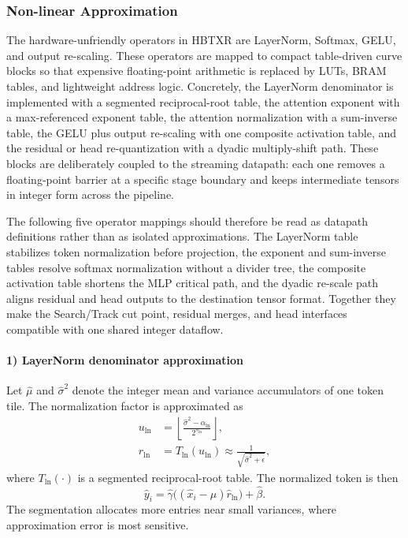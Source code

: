 \documentclass[journal]{IEEEtran}
\begin{document}
\subsubsection{Non-linear Approximation}
The hardware-unfriendly operators in HBTXR are LayerNorm, Softmax, GELU, and output re-scaling. These operators are mapped to compact table-driven curve blocks so that expensive floating-point arithmetic is replaced by LUTs, BRAM tables, and lightweight address logic. Concretely, the LayerNorm denominator is implemented with a segmented reciprocal-root table, the attention exponent with a max-referenced exponent table, the attention normalization with a sum-inverse table, the GELU plus output re-scaling with one composite activation table, and the residual or head re-quantization with a dyadic multiply-shift path. These blocks are deliberately coupled to the streaming datapath: each one removes a floating-point barrier at a specific stage boundary and keeps intermediate tensors in integer form across the pipeline.

The following five operator mappings should therefore be read as datapath definitions rather than as isolated approximations. The LayerNorm table stabilizes token normalization before projection, the exponent and sum-inverse tables resolve softmax normalization without a divider tree, the composite activation table shortens the MLP critical path, and the dyadic re-scale path aligns residual and head outputs to the destination tensor format. Together they make the Search/Track cut point, residual merges, and head interfaces compatible with one shared integer dataflow.

\paragraph*{1) LayerNorm denominator approximation}
Let $\hat{\mu}$ and $\hat{\sigma}^2$ denote the integer mean and variance accumulators of one token tile. The normalization factor is approximated as
\begin{align}
u_{\mathrm{ln}} &= \left\lfloor \frac{\hat{\sigma}^2-\alpha_{\mathrm{ln}}}{2^{s_{\mathrm{ln}}}} \right\rfloor,\\
\hat r_{\mathrm{ln}} &= T_{\mathrm{ln}}(u_{\mathrm{ln}})
\approx \frac{1}{\sqrt{\hat{\sigma}^2+\epsilon}},
\end{align}
where $T_{\mathrm{ln}}(\cdot)$ is a segmented reciprocal-root table. The normalized token is then
\begin{equation}
\hat y_i = \hat\gamma \big((\hat x_i-\hat\mu)\hat r_{\mathrm{ln}}\big) + \hat\beta.
\end{equation}
The segmentation allocates more entries near small variances, where approximation error is most sensitive.
\end{document}
